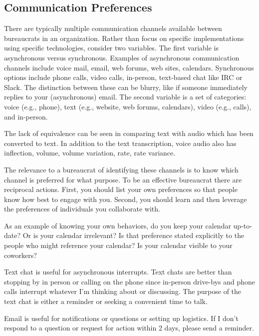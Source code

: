 \subsection{Communication Preferences}

There are typically multiple communication channels available between bureaucrats in an organization. Rather than focus on specific implementations using specific technologies, consider two variables. The first variable is asynchronous versus synchronous. Examples of asynchronous communication channels include voice mail, email, web forums, web sites, calendars. Synchronous options include phone calls, video calls, in-person, text-based chat like IRC or Slack. The distinction between these can be blurry, like if someone immediately replies to your (asynchronous) email.  The second variable is a set of categories: voice (e.g., phone), text (e.g., website, web forums, calendars), video (e.g., calls), and in-person. 

The lack of equivalence can be seen in comparing text with audio which has been converted to text. In addition to the text transcription, voice audio also has inflection, volume, volume variation, rate, rate variance.

The relevance to a bureaucrat of identifying these channels is to know which channel is preferred for what purpose. To be an effective bureaucrat there are reciprocal actions. First, you should list your own preferences so that people know how best to engage with you. Second, you should learn and then leverage the preferences of individuals you collaborate with.

As an example of knowing your own behaviors, do you keep your calendar up-to-date? Or is your calendar irrelevant? Is that preference stated explicitly to the people who might reference your calendar? Is your calendar visible to your coworkers?

Text chat is useful for asynchronous interrupts. Text chats are better than stopping by in person or calling on the phone since in-person drive-bys and phone calls interrupt whatever I'm thinking about or discussing. The purpose of the text chat is either a reminder or seeking a convenient time to talk. 

Email is useful for notifications or questions or setting up logistics. If I don't respond to a question or request for action within 2 days, please send a reminder. 

